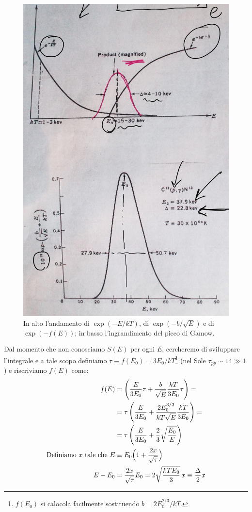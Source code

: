 \begin{figure}[h]
    \centering
    \includegraphics[scale=0.2]{Immagini/0324_gamow2.png}
    \caption{In alto l'andamento di $\exp{(-E/kT)}$, di $\exp{(-b/\sqrt{E})}$ e di $\exp{(-f(E))}$; in basso l'ingrandimento del picco di Gamow.}
    \label{0324_picco}
\end{figure}
\noindent Dal momento che non conosciamo $S(E)$ per ogni $E$, cercheremo di sviluppare l'integrale e a tale scopo definiamo $\tau\equiv f(E_0)= 3E_0/kT$\footnote{$f(E_0)$ si calocola facilmente sostituendo $b=2E_0^{2/3}/kT$.} (nel Sole $\tau_{pp}\sim 14\gg 1$) e riscriviamo $f(E)$ come:
\begin{align*}
f(E) &= \Biggl ( \frac{E}{3E_0}\tau + \frac{b}{\sqrt{E}}\frac{kT}{3E_0} \tau \Biggr ) =\\
&= \tau \, \Biggl ( \frac{E}{3E_0} + \frac{2E_0^{3/2}}{kT \sqrt{E}}\frac{kT}{3E_0} \Biggr ) =\\
&= \tau \, \Biggl ( \frac{E}{3E_0} + \frac{2}{3}\sqrt{\frac{E_0}{E}} \Biggr )\\
\text{Definiamo } x \text{ tale che } E&\equiv E_0 \Bigl ( 1+\frac{2x}{\sqrt{\tau}} \Bigr )\\
E-E_0 &= \frac{2x}{\sqrt{\tau}}E_0 = 2\sqrt{\frac{kTE_0}{3}}\,x \equiv \frac{\Delta}{2} x
\end{align*}
